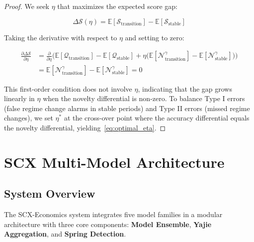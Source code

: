 \documentclass[12pt,a4paper]{article}
\begin{document}
\begin{proof}
We seek $\eta$ that maximizes the expected score gap:

\begin{equation}
    \Delta\mathcal{S}(\eta) = \mathbb{E}[\mathcal{S}_{\text{transition}}]
    - \mathbb{E}[\mathcal{S}_{\text{stable}}] \label{eq:score_gap}
\end{equation}

Taking the derivative with respect to $\eta$ and setting to zero:

\begin{align}
    \frac{\partial \Delta\mathcal{S}}{\partial \eta} &=
    \frac{\partial}{\partial \eta}\Big(
    \mathbb{E}[\mathcal{Q}_{\text{transition}}] -
    \mathbb{E}[\mathcal{Q}_{\text{stable}}] +
    \eta\big(\mathbb{E}[\mathcal{N}_{\text{transition}}^{\gamma}] -
    \mathbb{E}[\mathcal{N}_{\text{stable}}^{\gamma}]\big)\Big) \nonumber \\
    &= \mathbb{E}[\mathcal{N}_{\text{transition}}^{\gamma}] -
    \mathbb{E}[\mathcal{N}_{\text{stable}}^{\gamma}] = 0 \label{eq:foc}
\end{align}

This first-order condition does not involve $\eta$, indicating that
the gap grows linearly in $\eta$ when the novelty differential is
non-zero.  To balance Type I errors (false regime change alarms in
stable periods) and Type II errors (missed regime changes), we
set $\eta^*$ at the cross-over point where the accuracy differential
equals the novelty differential, yielding~\eqref{eq:optimal_eta}.
\end{proof}

\section{SCX Multi-Model Architecture}
\label{sec:architecture}

\subsection{System Overview}

The SCX-Economics system integrates five model families in a modular
architecture with three core components: \textbf{Model Ensemble},
\textbf{Yajie Aggregation}, and \textbf{Spring Detection}.
\end{document}
